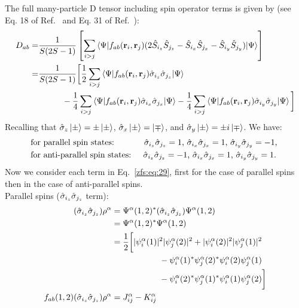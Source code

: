 The full many-particle D tensor including spin operator terms is given by (see Eq. 18 of Ref.~\cite{rayson2008first} and Eq. 31 of Ref.~\cite{ganyushin2006first}):
\begin{align}
    D_{ab}=&\frac{1}{S(2S-1)} \left[
        \sum_{i>j}\braket{\Psi|f_{ab}(\mathbf{r}_i,\mathbf{r}_j)
        (2\hat{S}_{i_z}\hat{S}_{j_z}-\hat{S}_{i_x}\hat{S}_{j_x}-\hat{S}_{i_y}\hat{S}_{j_y})|\Psi}
        \right] \label{zfs:eq:28} \\
    =&\frac{1}{S(2S-1)} \bigg[
        \frac{1}{2}\sum_{i>j}\braket{\Psi|f_{ab}(\mathbf{r}_i,\mathbf{r}_j)
        \hat{\sigma}_{i_z}\hat{\sigma}_{j_z}|\Psi} \label{zfs:eq:29} \\
        &\hspace{1cm}-\frac{1}{4}\sum_{i>j}\braket{\Psi|f_{ab}(\mathbf{r}_i,\mathbf{r}_j)
        \hat{\sigma}_{i_x}\hat{\sigma}_{j_x}|\Psi}
        -\frac{1}{4}\sum_{i>j}\braket{\Psi|f_{ab}(\mathbf{r}_i,\mathbf{r}_j)
        \hat{\sigma}_{i_y}\hat{\sigma}_{j_y}|\Psi}
        \bigg]
    \nonumber
\end{align}
Recalling that $\hat{\sigma}_{z}\ket{\pm}=\pm\ket{\pm}$, $\hat{\sigma}_{x}\ket{\pm}=\ket{\mp}$, and $\hat{\sigma}_{y}\ket{\pm}=\pm i\ket{\mp}$. We have:
\begin{align}
    &\text{for parallel spin states: }&
        \hat{\sigma}_{i_z}\hat{\sigma}_{j_z} = 1 \text{,  }
        \hat{\sigma}_{i_x}\hat{\sigma}_{j_x} = 1 \text{,  }
        \hat{\sigma}_{i_y}\hat{\sigma}_{j_y} = -1 \text{,  } \label{zfs:eq:30} \\
    &\text{for anti-parallel spin states: }&
        \hat{\sigma}_{i_z}\hat{\sigma}_{j_z} = -1 \text{,  }
        \hat{\sigma}_{i_x}\hat{\sigma}_{j_x} = 1 \text{,  }
        \hat{\sigma}_{i_y}\hat{\sigma}_{j_y} = 1 \text{. }
        \label{zfs:eq:31}
\end{align}
Now we consider each term in Eq.~\ref{zfs:eq:29}, first for the case of parallel spins then in the case of anti-parallel spins.\\
Parallel spins ($\hat{\sigma}_{i_z}\hat{\sigma}_{j_z}$ term):
\begin{align}
    (\hat{\sigma}_{i_z}\hat{\sigma}_{j_z})\rho^{\alpha} &= \Psi^\alpha(1,2)^*(\hat{\sigma}_{i_z}\hat{\sigma}_{j_z})\Psi^\alpha(1,2) \label{zfs:eq:32} \\
     &= \Psi^\alpha(1,2)^*\Psi^\alpha(1,2) \label{zfs:eq:33} \\
    &= \frac{1}{2} \bigg[
    |\psi_i^\alpha(1)|^2|\psi_j^\alpha(2)|^2
    + |\psi_i^\alpha(2)|^2|\psi_j^\alpha(1)|^2 \label{zfs:eq:34} \\
    &\hspace{2cm}- \psi_i^\alpha(1)^*\psi_j^\alpha(2)^*\psi_i^\alpha(2)\psi_j^\alpha(1) \notag \\
    &\hspace{2cm}- \psi_i^\alpha(2)^*\psi_j^\alpha(1)^*\psi_i^\alpha(1)\psi_j^\alpha(2) \bigg] \notag \\
    f_{ab}(1,2)(\hat{\sigma}_{i_z}\hat{\sigma}_{j_z})\rho^{\alpha}&= J_{ij}^{\alpha} - K_{ij}^{\alpha} \label{zfs:eq:35}
\end{align}
